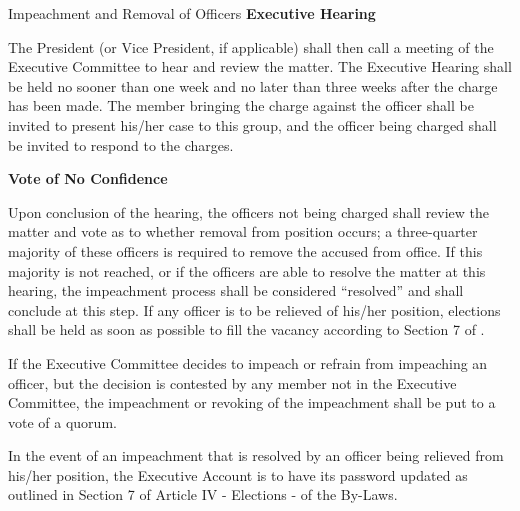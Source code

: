 {\begin{article}{Impeachment and Removal of Officers}
	\hypertarget{Executive Hearing}{}
	\textbf{Executive Hearing}

	The President (or Vice President, if applicable) shall then call a meeting of the Executive Committee to hear and review the matter. The Executive Hearing shall be held no sooner than one week and no later than three weeks after the charge has been made. The member bringing the charge against the officer shall be invited to present his/her case to this group, and the officer being charged shall be invited to respond to the charges.

	\hypertarget{Vote of No Confidence}{}
	\textbf{Vote of No Confidence}

	Upon conclusion of the hearing, the officers not being charged shall review the matter and vote as to whether removal from position occurs; a three-quarter majority of these officers is required to remove the accused from office. If this majority is not reached, or if the officers are able to resolve the matter at this hearing, the impeachment process shall be considered \enquote{resolved} and shall conclude at this step. If any officer is to be relieved of his/her position, elections shall be held as soon as possible to fill the vacancy according to Section 7 of .
	
	\item If the Executive Committee decides to impeach or refrain from impeaching an officer, but the decision is contested by any member not in the Executive Committee, the impeachment or revoking of the impeachment shall be put to a vote of a quorum.
	\item In the event of an impeachment that is resolved by an officer being relieved from his/her position, the Executive Account is to have its password updated as outlined in Section 7 of Article IV  - Elections - of the By-Laws.
\end{article}
}